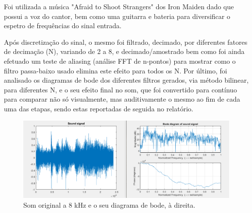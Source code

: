 \documentclass{article}
\begin{document}
    Foi utilizada a música "Afraid to Shoot Strangers" dos Iron Maiden dado que possui a voz do cantor, bem
    como uma guitarra e bateria para diversificar o espetro de frequências do sinal entrada.

    Após discretização do sinal, o mesmo foi filtrado, decimado, por diferentes fatores de decimação (N), variando de 2 a 8, e decimado/amostrado bem como foi ainda efetuado um teste de aliasing (análise FFT de n-pontos) para mostrar como o filtro passa-baixo usado elimina este efeito para todos os N.
    Por último, foi analisado os diagramas de bode dos diferentes filtros gerados, via método bilinear, para diferentes N, e o seu efeito final no som, que foi convertido para contínuo para comparar não só visualmente, mas auditivamente o mesmo ao fim de cada uma das etapas, sendo estas reportadas de seguida no relatório.
    
   
\begin{figure}[h!]
\centering
\includegraphics[scale=0.5]{matlab_test_images/som_org.PNG}
\caption{Som original a 8 kHz e o seu diagrama de bode, à direita.}
\label{fig:matlab_test_images/som_org}
\end{figure}  
\newpage
\end{document}
